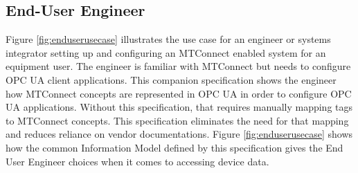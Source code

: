 
\FloatBarrier

\subsection{End-User Engineer}

Figure \ref{fig:enduserusecase} illustrates the use case for an engineer or systems integrator setting up and configuring an MTConnect enabled system for an equipment user. The engineer is familiar with MTConnect but needs to configure OPC UA client applications. This companion specification shows the engineer how MTConnect concepts are represented in OPC UA in order to configure OPC UA applications. Without this specification, that requires manually mapping tags to MTConnect concepts. This specification eliminates the need for that mapping and reduces reliance on vendor documentations.  Figure \ref{fig:enduserusecase} shows how the common Information Model defined by this specification gives the End User Engineer choices when it comes to accessing device data.


\FloatBarrier
